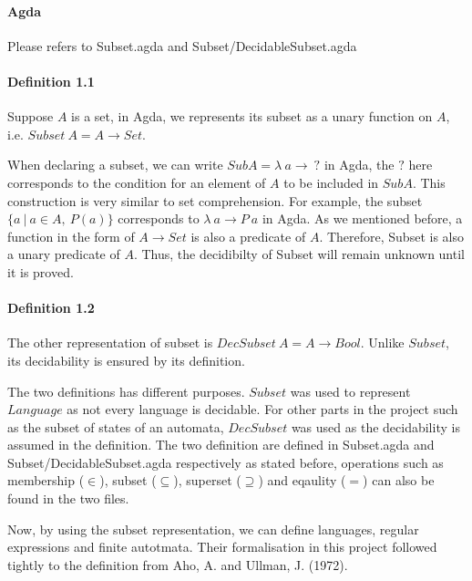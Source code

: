 \documentclass[twoside,openright,final]{bhamthesis}
\begin{document}
\paragraph{Agda} Please refers to Subset.agda and Subset/DecidableSubset.agda

\paragraph{Definition 1.1} Suppose \(A\) is a set, in Agda, we represents its subset as a unary function on
\(A\), i.e. \(Subset\ A = A \to Set\). \\

\par When declaring a subset, we can write \(SubA =
\lambda\ a \to\ ?\) in Agda, the \(?\) here corresponds to the
condition for an element of \(A\) to be included in \(SubA\). This construction is
very similar to set comprehension. For example, the subset 
\(\{a\ | \ a \in A,\ P(a)\}\) corresponds to \(\lambda\ a \to P\ a\)
in Agda. As we mentioned before, a function in the form of \(A \to
Set\) is also a predicate of \(A\). Therefore, Subset is also a unary
predicate of \(A\). Thus, the decidibilty of Subset will remain
unknown until it is proved. 

\paragraph{Definition 1.2} The other representation of subset is \(DecSubset\ A = A \to
Bool\). Unlike \(Subset\), its decidability is ensured by its
definition. \\

\par The two definitions has different purposes. \(Subset\) was used to represent \(Language\) as not every
language is decidable. For other parts in the project 
such as the subset of states of an automata, \(DecSubset\) was used
as the decidability is assumed in the definition. The two definition
are defined in Subset.agda and Subset/DecidableSubset.agda
respectively as stated before, operations such as membership (\(\in\)), subset
(\(\subseteq\)), superset (\(\supseteq\)) and eqaulity (\(=\)) can
also be found in the two files. 

\par Now, by using the subset representation, we can define languages, regular expressions and finite
autotmata. Their formalisation in this project followed tightly to the
definition from Aho, A. and Ullman, J. (1972). 
\end{document}
